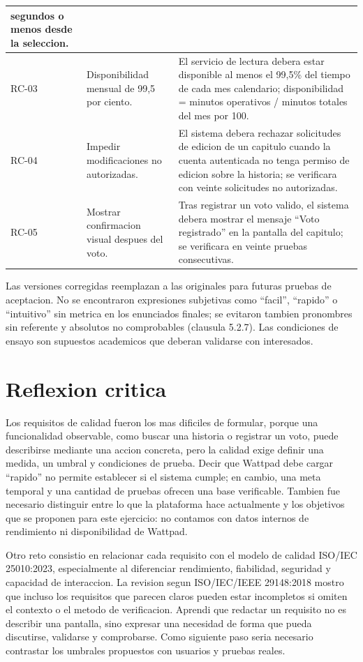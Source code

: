 \documentclass[11pt,a4paper]{article}
\begin{document}
\begin{longtable}{|p{1.25cm}|p{5.8cm}|p{7.2cm}|}
segundos o menos desde la seleccion.\\ \hline
RC-03 & Disponibilidad mensual de 99,5 por ciento. &
El servicio de lectura debera estar disponible al menos el 99,5\%
del tiempo de cada mes calendario; disponibilidad = minutos
operativos / minutos totales del mes por 100.\\ \hline
RC-04 & Impedir modificaciones no autorizadas. &
El sistema debera rechazar solicitudes de edicion de un capitulo
cuando la cuenta autenticada no tenga permiso de edicion sobre la
historia; se verificara con veinte solicitudes no autorizadas.\\ \hline
RC-05 & Mostrar confirmacion visual despues del voto. &
Tras registrar un voto valido, el sistema debera mostrar el mensaje
``Voto registrado'' en la pantalla del capitulo; se verificara en
veinte pruebas consecutivas.\\ \hline
\end{longtable}
\normalsize

Las versiones corregidas reemplazan a las originales para futuras
pruebas de aceptacion. No se encontraron expresiones subjetivas como
``facil'', ``rapido'' o ``intuitivo'' sin metrica en los enunciados
finales; se evitaron tambien pronombres sin referente y absolutos
no comprobables (clausula 5.2.7). Las condiciones de ensayo son
supuestos academicos que deberan validarse con interesados.

\section{Reflexion critica}

Los requisitos de calidad fueron los mas dificiles de formular,
porque una funcionalidad observable, como buscar una historia o
registrar un voto, puede describirse mediante una accion concreta,
pero la calidad exige definir una medida, un umbral y condiciones de
prueba. Decir que Wattpad debe cargar ``rapido'' no permite establecer
si el sistema cumple; en cambio, una meta temporal y una cantidad de
pruebas ofrecen una base verificable. Tambien fue necesario distinguir
entre lo que la plataforma hace actualmente y los objetivos que se
proponen para este ejercicio: no contamos con datos internos de
rendimiento ni disponibilidad de Wattpad.

Otro reto consistio en relacionar cada requisito con el modelo de
calidad ISO/IEC 25010:2023, especialmente al diferenciar rendimiento,
fiabilidad, seguridad y capacidad de interaccion. La revision segun
ISO/IEC/IEEE 29148:2018 mostro que incluso los requisitos que parecen
claros pueden estar incompletos si omiten el contexto o el metodo de
verificacion. Aprendi que redactar un requisito no es describir una
pantalla, sino expresar una necesidad de forma que pueda discutirse,
validarse y comprobarse. Como siguiente paso seria necesario
contrastar los umbrales propuestos con usuarios y pruebas reales.
\end{document}
